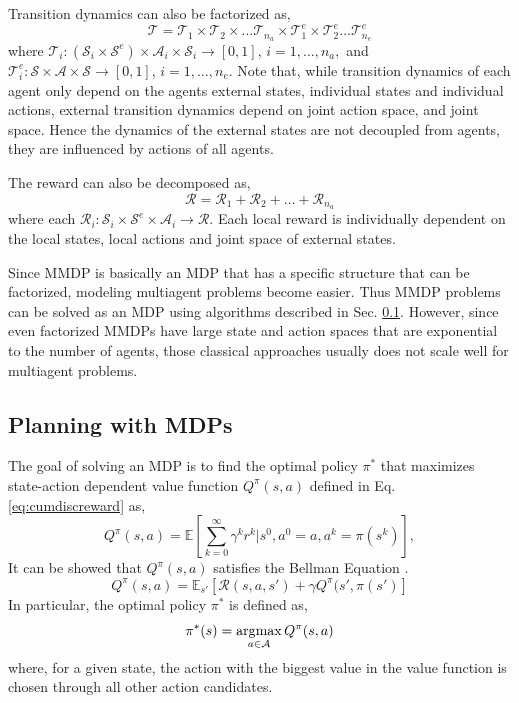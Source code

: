 \documentclass{ituphdreport}
\begin{document}
Transition dynamics can also be factorized as,
\begin{equation}
\label{eq:factorizedtransition}
\mathcal{T} = \mathcal{T}_1 \times \mathcal{T}_2 \times \dots \mathcal{T}_{n_a} 
\times \mathcal{T}^e_1 \times \mathcal{T}^e_2 \ldots \mathcal{T}^e_{n_e}
\end{equation}
where $\mathcal{T}_i : (\mathcal{S}_i \times \mathcal{S}^e) \times \mathcal{A}_i \times \mathcal{S}_i \rightarrow [0,1]$,
$i=1,\dots ,n_a,$ 
and $\mathcal{T}^e_i :
\mathcal{S} \times \mathcal{A} \times \mathcal{S} \rightarrow [0,1]$, 
$i=1,\dots,n_e$. Note that, while transition dynamics of each agent only depend on the agents external states, individual states and individual actions, external transition dynamics depend on joint action space, and joint space. Hence the dynamics of the external states are not decoupled from agents, they are influenced by actions of all agents.

The reward can also be decomposed as,
\begin{equation}
\label{eq:factorizedreward}
\mathcal{R} = \mathcal{R}_1 + \mathcal{R}_2 + \dots + \mathcal{R}_{n_a}
\end{equation}
where each $\mathcal{R}_i : \mathcal{S}_i \times \mathcal{S}^e \times \mathcal{A}_i \rightarrow \mathcal{R}$. Each local reward is individually dependent on the local states, local actions and joint space of external states.

Since MMDP is basically an MDP that has a specific structure that can be factorized, modeling multiagent problems become easier. Thus MMDP problems can be solved as an MDP using algorithms described in Sec. \ref{sec:planningwithmdps}. However, since even factorized MMDPs have large state and action spaces that are exponential to the number of agents, those classical approaches usually does not scale well for multiagent problems.

\subsection{Planning with MDPs} \label{sec:planningwithmdps}
The goal of solving an MDP is to find the optimal policy $\pi^*$ that maximizes state-action dependent value function $Q^\pi(s,a)$ defined in Eq. \ref{eq:cumdiscreward} as,
\begin{equation}
\label{eq:cumdiscreward}
Q^\pi (s,a) = \mathbb{E} \left[ \sum_{k=0}^{\infty}{\gamma^k r^k \vert s^0, a^0 = a, a^k = \pi(s^k)} \right],
\end{equation}
It can be showed that $Q^\pi (s,a)$ satisfies the Bellman Equation \cite{bellman1958dynamic}.
\begin{equation}
\label{eq:bellmanQ}
Q^\pi (s,a) = \mathbb{E}_{s'} \left[ 
\mathcal{R}(s,a,s') + \gamma Q^\pi (s',\pi(s')
\right]
\end{equation}
In particular, the optimal policy $\pi^*$ is defined as,
\begin{equation}
\label{eq:optimalpolicy}
\pi^*(s) = \operatorname*{\arg\!\max}_{a\in \mathcal{A}} Q^{\pi}(s,a)
\end{equation}
where, for a given state, the action with the biggest value in the value function is chosen through all other action candidates. 
\end{document}
